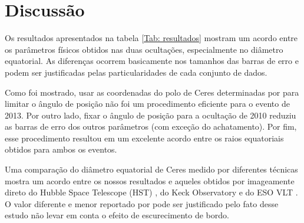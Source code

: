 \documentclass[12pt,a4paper]{report}
\begin{document}
\section{Discussão}
\label{Sec: Ceres-discussao} 

\indent \indent Os resultados apresentados na tabela \ref{Tab: resultados} mostram um acordo entre os parâmetros físicos obtidos nas duas ocultações, especialmente no diâmetro equatorial. As diferenças ocorrem basicamente nos tamanhos das barras de erro e podem ser justificadas pelas particularidades de cada conjunto de dados.


Como foi mostrado, usar as coordenadas do polo de Ceres determinadas por \cite{Drummond2014} para limitar o ângulo de posição não foi um procedimento eficiente para o evento de 2013. Por outro lado, fixar o ângulo de posição para a ocultação de 2010 reduziu as barras de erro dos outros parâmetros (com exceção do achatamento). Por fim, esse procedimento resultou em um excelente acordo entre os raios equatoriais obtidos para ambos os eventos.

Uma comparação do diâmetro equatorial de Ceres medido por diferentes técnicas mostra um acordo entre os nossos resultados e aqueles obtidos por imageamente direto do Hubble Space Telescope (HST) \citep{Thomas2005}, do Keck Observatory e do ESO VLT \citep{Drummond2014}. O valor diferente e menor reportado por \cite{Carry2008} pode ser justificado pelo fato desse estudo não levar em conta o efeito de escurecimento de bordo.

\end{document}
